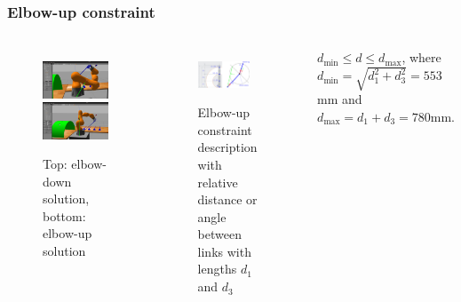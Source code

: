 \begin{frame}
\frametitle{Elbow-up constraint}
\begin{columns}
\begin{figure}[htbp]
\centering
\includegraphics[width=\textwidth]{../images/elbow-down.png}\\
\includegraphics[width=\textwidth]{../images/elbow-up.png}\\
\caption{Top: elbow-down solution, bottom: elbow-up solution}
\label{elbow-up-vs-down}
\end{figure}

\begin{figure}[htbp]
\centering
\includegraphics[width=0.8\textwidth]{../images/elbow-up-constraint-geometry.png}\\
\caption{Elbow-up constraint description with relative distance or angle between links with lengths $d_1$ and $d_3$}
\label{elbow-up-constraint-geometry}
\end{figure}
$d_{\min} \leq d \leq d_{\max}$,
where
$d_{\min} = \sqrt{d_1^2 + d_3^2} = 553$mm and $d_{\max} = d_1 + d_3 = 780\mbox{mm}.$
\end{columns}
\end{frame}
